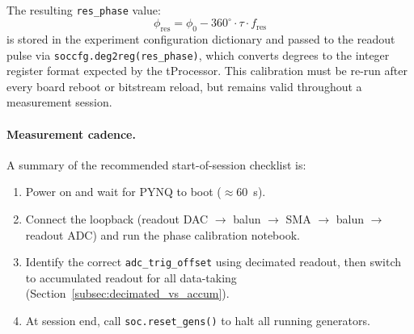 The resulting \texttt{res\_phase} value:
\begin{equation}
  \phi_\text{res} = \phi_0 - 360^\circ \cdot \tau \cdot f_\text{res}
\end{equation}
is stored in the experiment configuration dictionary and passed to the readout
pulse via \texttt{soccfg.deg2reg(res\_phase)}, which converts degrees to the
integer register format expected by the tProcessor.  This calibration must be
re-run after every board reboot or bitstream reload, but remains valid throughout
a measurement session.

\paragraph{Measurement cadence.}
A summary of the recommended start-of-session checklist is:
\begin{enumerate}
  \item Power on and wait for PYNQ to boot ($\approx$\SI{60}{\second}).
  \item Connect the loopback (readout DAC $\to$ balun $\to$ SMA $\to$ balun $\to$
        readout ADC) and run the phase calibration notebook.
  \item Identify the correct \texttt{adc\_trig\_offset} using decimated readout,
        then switch to accumulated readout for all data-taking
        (Section~\ref{subsec:decimated_vs_accum}).
  \item At session end, call \texttt{soc.reset\_gens()} to halt all running
        generators.
\end{enumerate}
